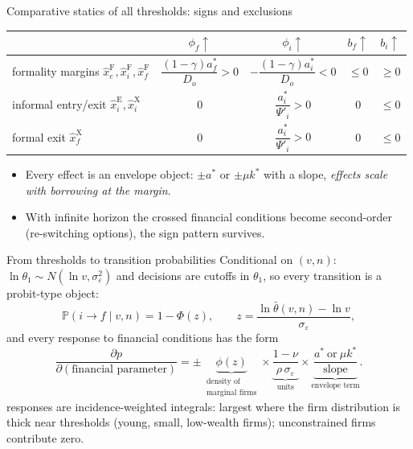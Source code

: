 \documentclass[11pt,aspectratio=169]{beamer}
\providecommand{\infml}{i}
\providecommand{\fml}{f}
\providecommand{\curv}{\gamma}
\providecommand{\spread}[1]{\phi_{#1}}
\providecommand{\collat}[1]{b_{#1}}
\providecommand{\netw}{n}
\providecommand{\thF}[1]{\hat{x}^{\mathrm{F}}_{#1}}
\providecommand{\thX}[1]{\hat{x}^{\mathrm{X}}_{#1}}
\providecommand{\thE}[1]{\hat{x}^{\mathrm{E}}_{#1}}
\providecommand{\Prob}{\mathbb{P}}
\begin{document}
\begin{frame}{Comparative statics of all thresholds: signs and exclusions}
\begin{center}
\renewcommand{\arraystretch}{1.55}\small
\begin{tabular}{lcccc}
\toprule
 & $\spread{\fml}\uparrow$ & $\spread{\infml}\uparrow$ &
 $\collat{\fml}\uparrow$ & $\collat{\infml}\uparrow$ \\
\midrule
formality margins $\thF{e},\thF{\infml},\thF{\fml}$ &
$\dfrac{(1-\curv)a^{*}_{\fml}}{D_{o}}>0$ &
$-\dfrac{(1-\curv)a^{*}_{\infml}}{D_{o}}<0$ & $\leq0$ & $\geq0$ \\
informal entry/exit $\thE{\infml},\thX{\infml}$ & $0$ &
$\dfrac{a^{*}_{\infml}}{\Psi'_{\infml}}>0$ & $0$ & $\leq0$ \\
formal exit $\thX{\fml}$ & $0$ &
$\dfrac{a^{*}_{\infml}}{\Psi'_{\infml}}>0$ & $0$ & $\leq0$ \\
\bottomrule
\end{tabular}
\end{center}
\medskip
\begin{itemize}
  \item Every effect is an envelope object: $\pm a^{*}$ or $\pm\mu k^{*}$ with a slope, \emph{effects scale with borrowing at the margin}.
  \item With infinite horizon the crossed financial conditions become second-order (re-switching options), the sign pattern survives.
\end{itemize}
\end{frame}
 
\begin{frame}{From thresholds to transition probabilities}
Conditional on $(v,\netw)$: $\ln\theta_{1}\sim N(\ln v,
\sigma_{\varepsilon}^{2})$ and decisions are cutoffs in $\theta_{1}$,
so every transition is a probit-type object:
\begin{equation*}
  \Prob(\infml\to\fml\mid v,\netw)=1-\Phi(z),\qquad
  z=\frac{\ln\bar\theta(v,\netw)-\ln v}{\sigma_{\varepsilon}},
\end{equation*}
and every response to financial conditions has the form
\begin{equation*}
  \frac{\partial p}{\partial(\text{financial parameter})}
  =\pm\,\underbrace{\phi(z)}_{\substack{\text{density of}\\
  \text{marginal firms}}}\times
  \underbrace{\frac{1-\nu}{\rho\,\sigma_{\varepsilon}}}_{\text{units}}
  \times
  \underbrace{\frac{a^{*}\ \text{or}\ \mu k^{*}}{\text{slope}}}
  _{\text{envelope term}} .
\end{equation*}
 responses are incidence-weighted integrals: largest where the firm distribution is thick near thresholds
(young, small, low-wealth firms); unconstrained firms contribute
zero.
\end{frame}
 
\end{document}
